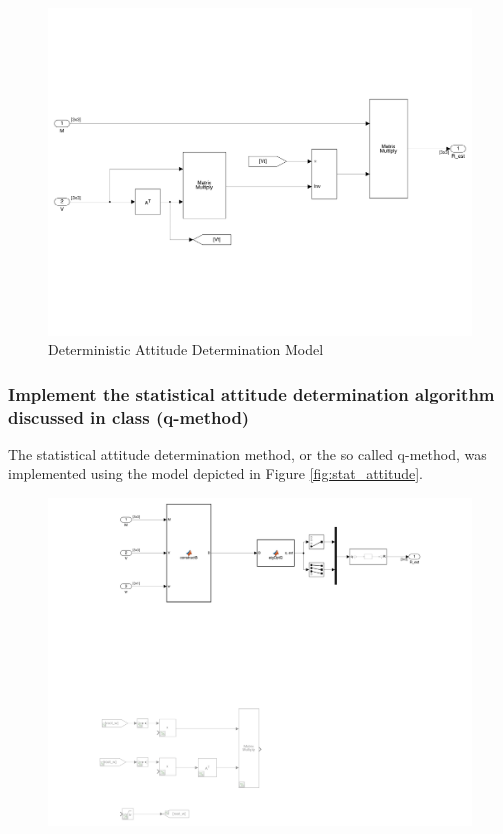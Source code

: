 \begin{figure}[H]
    \centering
    \captionsetup{ justification = centering }
    \includegraphics[trim={0.25cm 3cm 0.25cm 5cm},clip,width = 15cm]{Images/PS6/deterministicAttitude-1.png}
    \caption{Deterministic Attitude Determination Model}
    \label{fig:det_attitude}
\end{figure}

\subsubsection{Implement the statistical attitude determination algorithm discussed in class (q-method)}

The statistical attitude determination method, or the so called q-method, was implemented using the model depicted in Figure \ref{fig:stat_attitude}. 

\begin{figure}[H]
    \centering
    \captionsetup{ justification = centering }
    \includegraphics[trim={4cm 13cm 3cm 0cm},clip,width = 15cm]{Images/PS6/statisticalAttitude-1.png}
\end{figure}

